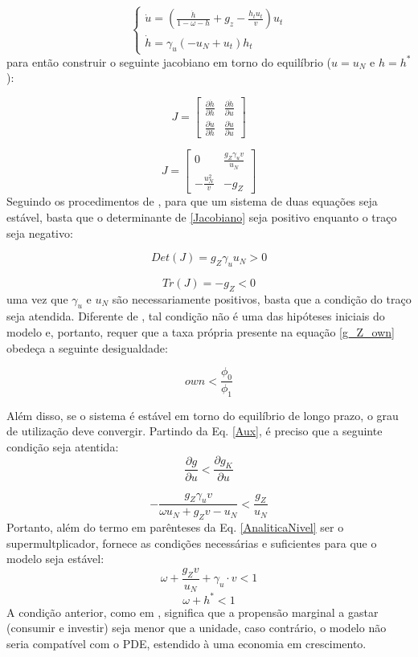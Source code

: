 $$
\begin{cases}
\dot u = \left(\frac{\dot h}{1 - \omega - h} + g_z - \frac{h_t u_t}{v}\right) u_t\\
\dot h = \gamma_{u} \left(- u_N + u_t\right) h_t
\end{cases}
$$
para então construir o seguinte jacobiano em torno do equilíbrio ($u = u_N$ e $h = h^*$):

$$
J = 
\left[\begin{matrix}
\frac{\partial \dot h}{\partial h} & \frac{\partial \dot h}{\partial u}\\
\frac{\partial \dot u}{\partial h} & \frac{\partial \dot u}{\partial u}
\end{matrix}\right]
$$

\begin{equation}
J = 
\label{Jacobiano}
\left[\begin{matrix}0 & \frac{g_Z \gamma_{u} v}{u_N}\\- \frac{u_N^{2}}{v} & - g_Z\end{matrix}\right]
\end{equation}
Seguindo os procedimentos de \textcite{gandolfo_economic_2010}, para que um sistema de duas equações seja estável, basta que o determinante de \ref{Jacobiano} seja positivo enquanto o traço seja negativo:

$$
Det(J) = g_Z \gamma_{u} u_N > 0
$$

$$
Tr(J) = -g_Z < 0
$$
uma vez que $\gamma_u$ e $u_N$ são necessariamente positivos, basta que a condição do traço seja atendida. Diferente de \textcite{freitas_growth_2015}, tal condição não é uma das hipóteses iniciais do modelo e, portanto, requer que a taxa própria presente na equação \ref{g_Z_own} obedeça a seguinte desigualdade:

\begin{equation}
own < \frac{\phi_0}{\phi_1}
\end{equation}

Além disso, se o sistema é estável em torno do equilíbrio de longo prazo, o grau de utilização deve convergir. Partindo da Eq. \ref{Aux}, é preciso que a seguinte condição seja atentida:
$$
\frac{\partial g}{\partial u} < \frac{\partial g_K}{\partial u}
$$

$$
- \frac{g_Z \gamma_{u} v}{\omega u_N + g_Z v - u_N} < \frac{g_Z}{u_N}
$$
Portanto, além do termo em parênteses da Eq. \ref{AnaliticaNivel} ser o supermultplicador, fornece as condições necessárias e suficientes para que o modelo seja estável: 
$$
\omega + \frac{g_Z v}{u_N} + \gamma_u\cdot v < 1
$$
\begin{equation}
\omega + h^* < 1
\end{equation}
A condição anterior, como em \textcite{freitas_growth_2015}, significa que a propensão marginal a gastar (consumir e investir) seja menor que a unidade, caso contrário, 
o modelo não seria compatível com o PDE, estendido à uma economia em crescimento.


